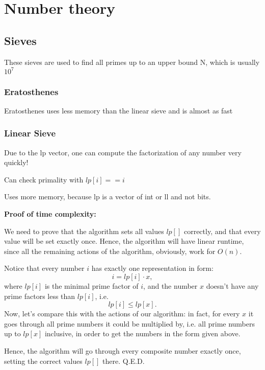 \chapter{Number theory}

\section{Sieves}

    These sieves are used to find all primes up to an upper bound N, which is usually $10^7$

    \subsection{Eratosthenes}

    Eratosthenes uses less memory than the linear sieve and is almost as fast


    \subsection{Linear Sieve}

    Due to the lp vector, one can compute the factorization of any number very quickly!

    Can check primality with $lp[i] == i$

    Uses more memory, because lp is a vector of int or ll and not bits.

    \textbf{Proof of time complexity:}

    We need to prove that the algorithm sets all values
    $lp[]$ correctly, and that every value will be set exactly once. 
    Hence, the algorithm will have linear runtime, since all the remaining actions of the algorithm, obviously, work for
    $O(n)$.

    Notice that every number $i$ has exactly one representation in form:
    $$i = lp [i] \cdot x,$$
    where 
    $lp [i]$ is the minimal prime factor of 
    $i$, and the number 
    $x$ doesn't have any prime factors less than 
    $lp [i]$, i.e.
    $$lp [i] \le lp [x].$$
    Now, let's compare this with the actions of our algorithm: in fact, for every 
    $x$ it goes through all prime numbers it could be multiplied by, i.e. all prime numbers up to 
    $lp [x]$ inclusive, in order to get the numbers in the form given above.

    Hence, the algorithm will go through every composite number exactly once, setting the correct values 
    $lp []$ there. Q.E.D.

